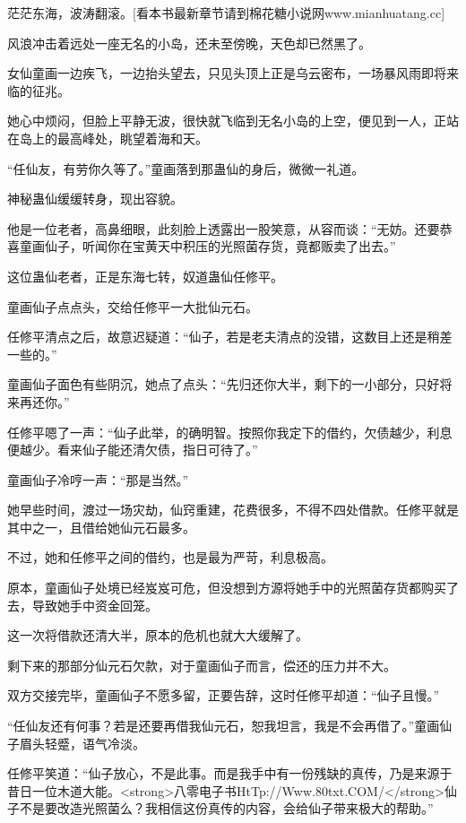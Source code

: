 
\begin{this_body}

茫茫东海，波涛翻滚。[看本书最新章节请到棉花糖小说网www.mianhuatang.cc]

风浪冲击着远处一座无名的小岛，还未至傍晚，天色却已然黑了。

女仙童画一边疾飞，一边抬头望去，只见头顶上正是乌云密布，一场暴风雨即将来临的征兆。

她心中烦闷，但脸上平静无波，很快就飞临到无名小岛的上空，便见到一人，正站在岛上的最高峰处，眺望着海和天。

“任仙友，有劳你久等了。”童画落到那蛊仙的身后，微微一礼道。

神秘蛊仙缓缓转身，现出容貌。

他是一位老者，高鼻细眼，此刻脸上透露出一股笑意，从容而谈：“无妨。还要恭喜童画仙子，听闻你在宝黄天中积压的光照菌存货，竟都贩卖了出去。”

这位蛊仙老者，正是东海七转，奴道蛊仙任修平。

童画仙子点点头，交给任修平一大批仙元石。

任修平清点之后，故意迟疑道：“仙子，若是老夫清点的没错，这数目上还是稍差一些的。”

童画仙子面色有些阴沉，她点了点头：“先归还你大半，剩下的一小部分，只好将来再还你。”

任修平嗯了一声：“仙子此举，的确明智。按照你我定下的借约，欠债越少，利息便越少。看来仙子能还清欠债，指日可待了。”

童画仙子冷哼一声：“那是当然。”

她早些时间，渡过一场灾劫，仙窍重建，花费很多，不得不四处借款。任修平就是其中之一，且借给她仙元石最多。

不过，她和任修平之间的借约，也是最为严苛，利息极高。

原本，童画仙子处境已经岌岌可危，但没想到方源将她手中的光照菌存货都购买了去，导致她手中资金回笼。

这一次将借款还清大半，原本的危机也就大大缓解了。

剩下来的那部分仙元石欠款，对于童画仙子而言，偿还的压力并不大。

双方交接完毕，童画仙子不愿多留，正要告辞，这时任修平却道：“仙子且慢。”

“任仙友还有何事？若是还要再借我仙元石，恕我坦言，我是不会再借了。”童画仙子眉头轻蹙，语气冷淡。

任修平笑道：“仙子放心，不是此事。而是我手中有一份残缺的真传，乃是来源于昔日一位木道大能。<strong>八零电子书HtTp://Www.80txt.COM/</strong>仙子不是要改造光照菌么？我相信这份真传的内容，会给仙子带来极大的帮助。”


\end{this_body}
